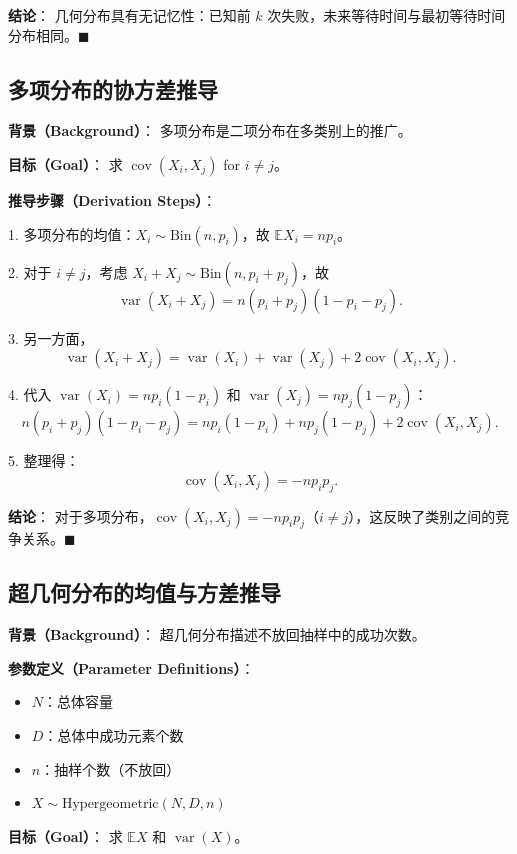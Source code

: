 \textbf{结论}：
几何分布具有无记忆性：已知前 $k$ 次失败，未来等待时间与最初等待时间分布相同。$\blacksquare$

\subsection{多项分布的协方差推导}\label{sec:multinomial-covariance}

\textbf{背景（Background）}：
多项分布是二项分布在多类别上的推广。

\textbf{目标（Goal）}：
求 $\operatorname{cov}(X_i, X_j)$ for $i \neq j$。

\textbf{推导步骤（Derivation Steps）}：

1. 多项分布的均值：$X_i \sim \text{Bin}(n, p_i)$，故 $\mathbb{E}X_i = np_i$。

2. 对于 $i \neq j$，考虑 $X_i + X_j \sim \text{Bin}(n, p_i + p_j)$，故
\[
\operatorname{var}(X_i + X_j) = n(p_i + p_j)(1 - p_i - p_j).
\]

3. 另一方面，
\[
\operatorname{var}(X_i + X_j) = \operatorname{var}(X_i) + \operatorname{var}(X_j) + 2\operatorname{cov}(X_i, X_j).
\]

4. 代入 $\operatorname{var}(X_i) = np_i(1-p_i)$ 和 $\operatorname{var}(X_j) = np_j(1-p_j)$：
\[
n(p_i + p_j)(1 - p_i - p_j) = np_i(1-p_i) + np_j(1-p_j) + 2\operatorname{cov}(X_i, X_j).
\]

5. 整理得：
\[
\operatorname{cov}(X_i, X_j) = -np_ip_j.
\]

\textbf{结论}：
对于多项分布，$\operatorname{cov}(X_i, X_j) = -np_ip_j$（$i \neq j$），这反映了类别之间的竞争关系。$\blacksquare$

\subsection{超几何分布的均值与方差推导}\label{sec:hypergeometric-mean-variance}

\textbf{背景（Background）}：
超几何分布描述不放回抽样中的成功次数。

\textbf{参数定义（Parameter Definitions）}：
\begin{itemize}
\item $N$：总体容量
\item $D$：总体中成功元素个数
\item $n$：抽样个数（不放回）
\item $X \sim \text{Hypergeometric}(N, D, n)$
\end{itemize}

\textbf{目标（Goal）}：
求 $\mathbb{E}X$ 和 $\operatorname{var}(X)$。

